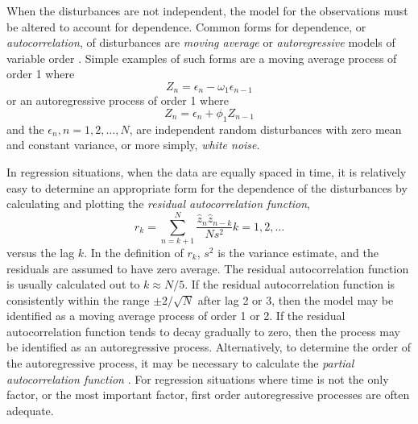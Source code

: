 When the disturbances are not independent, the
model for the observations must be altered to account for
dependence.
Common forms for dependence, or \emph{autocorrelation}, of
disturbances are \emph{moving average}
or \emph{autoregressive}
models of variable order \cite{box:jenk:1976}.
Simple examples of such forms are a moving average process of
order 1 where
\begin{displaymath}
Z_n = \epsilon_n - \omega_1 \epsilon_{n-1}
\end{displaymath}
or an autoregressive process of order 1 where
\begin{displaymath}
Z_n = \epsilon_n + \phi_1 Z_{n-1}
\end{displaymath}
and the $\epsilon_n , n = 1, 2 ,\ldots, N$, are independent random
disturbances with zero mean and constant variance,
or more simply, \emph{white noise}.

In regression situations,
when the data are equally spaced in time, it is relatively easy
to determine an appropriate form for the dependence of the
disturbances by calculating and plotting the \emph{residual
autocorrelation function},
\begin{displaymath}
r_k = \sum_{n=k+1}^N
\frac{\hat z_n\hat z_{n-k}}{N s^2}   
k = 1,  2,\ldots
\end{displaymath}
versus the lag $k$.
In the definition of $r_{k}$, $s^{2}$ is the
variance estimate,
and the residuals are assumed to have zero average.
The residual autocorrelation function is usually calculated
out to $ k  \approx  N / 5 $.
If the residual autocorrelation function is consistently within
the range $\pm 2 / \sqrt N $ after lag 2 or 3, then
the model may be identified as a moving average process of order
1 or 2.
If the residual autocorrelation function tends to decay gradually
to zero, then the process may be identified as an autoregressive
process.
Alternatively, to determine the order of the autoregressive
process, it may be necessary to calculate the
\emph{partial autocorrelation function}
\cite{box:jenk:1976}.
For regression situations where time is not the only
factor, or the most important factor, first order
autoregressive processes are often adequate.

